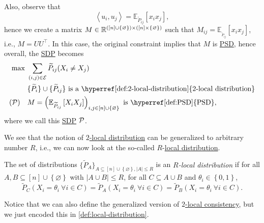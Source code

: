 Also, observe that
\[
	\left\langle u_i, u_j \right\rangle = \mathbb{E}_{\widetilde{P} _{ij}}\left[ x_i x_j\right],
\]
hence we create a matrix \(M\in \mathbb{\MakeUppercase{r}} ^{([n] \cup \left\{ \varnothing  \right\} )\times ([n] \times \left\{ \varnothing  \right\} )}\) such that \(M_{ij} = \mathbb{E}_{_{\widetilde{P} _{ij}}}\left[ x_i x_j\right] \), i.e., \(M = U U ^{\top} \). In this case, the original constraint implies that \(M\) is \hyperref[def:PSD]{PSD}, hence overall, the \hyperref[def:SDP]{SDP} becomes
\[
	\begin{aligned}
		\max~                               & \sum_{(i, j)\in \mathcal{\MakeUppercase{e}} } \widetilde{P} _{ij} (X_i \neq X_j)                                                                              \\
		                                    & \{\widetilde{P} _i\}\cup \{\widetilde{P} _{ij}\}\text{ is a \hyperref[def:2-local-distribution]{\(2\)-local distribution}}                                    \\
		(\mathcal{\MakeUppercase{p}} )\quad & M = \left( \mathbb{E}_{\widetilde{P} _{ij}}\left[X_i X_j \right] \right) _{i, j\in [n]\cup \left\{ \varnothing  \right\} }\text{ is \hyperref[def:PSD]{PSD}},
	\end{aligned}
\]
where we call this \hyperref[def:SDP]{SDP} \(\mathcal{\MakeUppercase{p}} \).

We see that the notion of \hyperref[def:2-local-distribution]{\(2\)-local distribution} can be generalized to arbitrary number \(R\), i.e., we can now look at the so-called \(R\)-\hyperref[def:local-distribution]{local distribution}.

\begin{definition}\label{def:local-distribution}
	The set of distributions \(\{ \widetilde{P} _A \}_{A \subseteq [n] \cup \left\{ \varnothing  \right\}, \left\vert A \right\vert \leq R} \) is an \emph{\(R\)-local distribution} if for all \(A, B \subseteq [n]\cup \left\{ \varnothing  \right\} \) with \(\left\vert A \cup B \right\vert \leq R\), for all \(C \subseteq A \cup B\) and \(\theta _i \in \left\{ 0, 1 \right\} \),
	\[
		\widetilde{P} _C (X_i = \theta _i\ \forall i\in C)
		= \widetilde{P} _A (X_i = \theta _i\ \forall i\in C)
		= \widetilde{P} _B (X_i = \theta _i\ \forall i\in C).
	\]
\end{definition}
\begin{note}
	Notice that we can also define the generalized version of \hyperref[def:2-local-consistency]{\(2\)-local consistency}, but we just encoded this in \autoref{def:local-distribution}.
\end{note}

